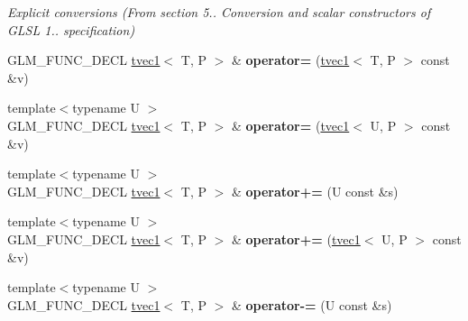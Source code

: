 \begin{DoxyCompactItemize}
\begin{DoxyCompactList}\small\item\em Explicit conversions (From section 5.. Conversion and scalar constructors of G\+L\+SL 1.. specification) \end{DoxyCompactList}\item 
G\+L\+M\+\_\+\+F\+U\+N\+C\+\_\+\+D\+E\+CL \hyperlink{structglm_1_1detail_1_1tvec1}{tvec1}$<$ T, P $>$ \& {\bfseries operator=} (\hyperlink{structglm_1_1detail_1_1tvec1}{tvec1}$<$ T, P $>$ const \&v)\hypertarget{structglm_1_1detail_1_1tvec1_a1e15e21ac8d2986fde39e7553fc41d8a}{}\label{structglm_1_1detail_1_1tvec1_a1e15e21ac8d2986fde39e7553fc41d8a}

\item 
{\footnotesize template$<$typename U $>$ }\\G\+L\+M\+\_\+\+F\+U\+N\+C\+\_\+\+D\+E\+CL \hyperlink{structglm_1_1detail_1_1tvec1}{tvec1}$<$ T, P $>$ \& {\bfseries operator=} (\hyperlink{structglm_1_1detail_1_1tvec1}{tvec1}$<$ U, P $>$ const \&v)\hypertarget{structglm_1_1detail_1_1tvec1_ae2928514df11c9bd6a89ed04ee2c57f7}{}\label{structglm_1_1detail_1_1tvec1_ae2928514df11c9bd6a89ed04ee2c57f7}

\item 
{\footnotesize template$<$typename U $>$ }\\G\+L\+M\+\_\+\+F\+U\+N\+C\+\_\+\+D\+E\+CL \hyperlink{structglm_1_1detail_1_1tvec1}{tvec1}$<$ T, P $>$ \& {\bfseries operator+=} (U const \&s)\hypertarget{structglm_1_1detail_1_1tvec1_a6ae40e6821e60a9018d1eb8a1cca3da9}{}\label{structglm_1_1detail_1_1tvec1_a6ae40e6821e60a9018d1eb8a1cca3da9}

\item 
{\footnotesize template$<$typename U $>$ }\\G\+L\+M\+\_\+\+F\+U\+N\+C\+\_\+\+D\+E\+CL \hyperlink{structglm_1_1detail_1_1tvec1}{tvec1}$<$ T, P $>$ \& {\bfseries operator+=} (\hyperlink{structglm_1_1detail_1_1tvec1}{tvec1}$<$ U, P $>$ const \&v)\hypertarget{structglm_1_1detail_1_1tvec1_af5d7976948734a9a514d87d8508ea2ac}{}\label{structglm_1_1detail_1_1tvec1_af5d7976948734a9a514d87d8508ea2ac}

\item 
{\footnotesize template$<$typename U $>$ }\\G\+L\+M\+\_\+\+F\+U\+N\+C\+\_\+\+D\+E\+CL \hyperlink{structglm_1_1detail_1_1tvec1}{tvec1}$<$ T, P $>$ \& {\bfseries operator-\/=} (U const \&s)\hypertarget{structglm_1_1detail_1_1tvec1_affba0ab0b93fbaa98d843c89433606f3}{}\label{structglm_1_1detail_1_1tvec1_affba0ab0b93fbaa98d843c89433606f3}


\end{DoxyCompactItemize}
